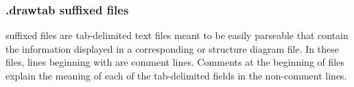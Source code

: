 \subsubsection{.drawtab suffixed files}
 suffixed files are tab-delimited text files meant to
be easily parseable that contain the information displayed in a
corresponding  or  structure diagram file. 
In these files, lines beginning with \prog{\#} are comment
lines. Comments at the beginning of  files explain the
meaning of each of the tab-delimited fields in the non-comment lines. 

